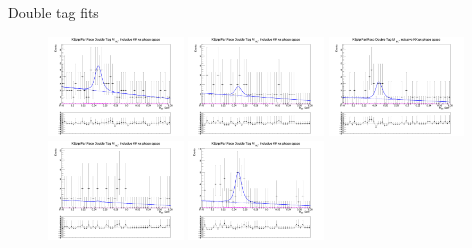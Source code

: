 \documentclass{beamer}
\begin{document}
\begin{frame}{Double tag fits}
  \begin{figure}
    \centering
    \includegraphics[width=0.32\textwidth, clip = true, trim = {0 11cm 0 0}]{Plots/DoubleTagYield_DoubleTag_SCMB_KKpipi_vs_KSpipiPartReco_SignalBin0_TagBin1.png}
    \includegraphics[width=0.32\textwidth, clip = true, trim = {0 11cm 0 0}]{Plots/DoubleTagYield_DoubleTag_SCMB_KKpipi_vs_KSpipiPartReco_SignalBin0_TagBin2.png}
    \includegraphics[width=0.32\textwidth, clip = true, trim = {0 11cm 0 0}]{Plots/DoubleTagYield_DoubleTag_SCMB_KKpipi_vs_KSpipiPartReco_SignalBin0_TagBin3.png}
    \includegraphics[width=0.32\textwidth, clip = true, trim = {0 11cm 0 0}]{Plots/DoubleTagYield_DoubleTag_SCMB_KKpipi_vs_KSpipiPartReco_SignalBin0_TagBin4.png}
    \includegraphics[width=0.32\textwidth, clip = true, trim = {0 11cm 0 0}]{Plots/DoubleTagYield_DoubleTag_SCMB_KKpipi_vs_KSpipiPartReco_SignalBin0_TagBin5.png}

\end{figure}
\end{frame}
\end{document}
